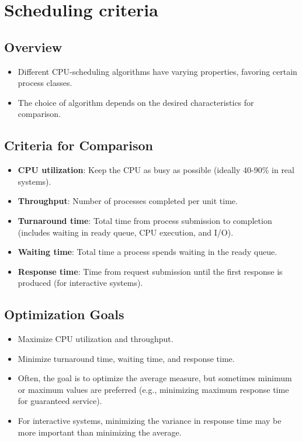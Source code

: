 \section{Scheduling criteria}\label{sec:5.2}

\subsection{Overview}
\begin{itemize}
    \item Different CPU-scheduling algorithms have varying properties, favoring certain process classes.
    \item The choice of algorithm depends on the desired characteristics for comparison.
\end{itemize}

\subsection{Criteria for Comparison}
\begin{itemize}
    \item \textbf{CPU utilization}: Keep the CPU as busy as possible (ideally 40-90\% in real systems).
    \item \textbf{Throughput}: Number of processes completed per unit time.
    \item \textbf{Turnaround time}: Total time from process submission to completion (includes waiting in ready queue, CPU execution, and I/O).
    \item \textbf{Waiting time}: Total time a process spends waiting in the ready queue.
    \item \textbf{Response time}: Time from request submission until the first response is produced (for interactive systems).
\end{itemize}

\subsection{Optimization Goals}
\begin{itemize}
    \item Maximize CPU utilization and throughput.
    \item Minimize turnaround time, waiting time, and response time.
    \item Often, the goal is to optimize the average measure, but sometimes minimum or maximum values are preferred (e.g., minimizing maximum response time for guaranteed service).
    \item For interactive systems, minimizing the variance in response time may be more important than minimizing the average.
\end{itemize}

